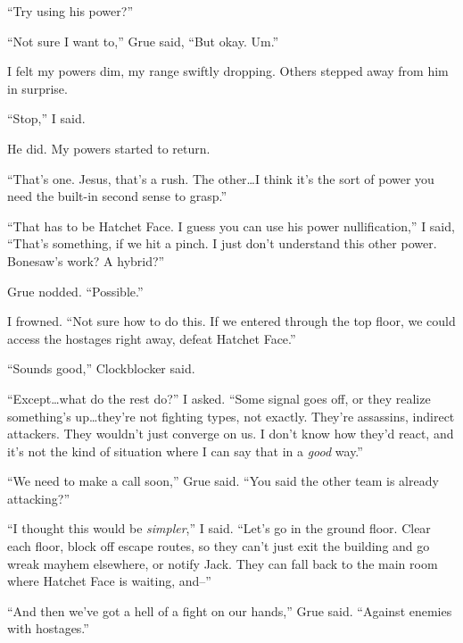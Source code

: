 ``Try using his power?''



``Not sure I want to,'' Grue said, ``But okay.  Um.''



I felt my powers dim, my range swiftly dropping.  Others stepped away from him in surprise.



``Stop,'' I said.



He did.  My powers started to return.



``That's one.  Jesus, that's a rush.  The other\ldots I think it's the sort of power you need the built-in second sense to grasp.''



``That has to be Hatchet Face.  I guess you can use his power nullification,'' I said, ``That's something, if we hit a pinch.  I just don't understand this other power.  Bonesaw's work?  A hybrid?''



Grue nodded.  ``Possible.''



I frowned.  ``Not sure how to do this.  If we entered through the top floor, we could access the hostages right away, defeat Hatchet Face.''



``Sounds good,'' Clockblocker said.



``Except\ldots what do the rest do?'' I asked.  ``Some signal goes off, or they realize something's up\ldots they're not fighting types, not exactly.  They're assassins, indirect attackers.  They wouldn't just converge on us.  I don't know how they'd react, and it's not the kind of situation where I can say that in a \emph{good} way.''



``We need to make a call soon,'' Grue said.  ``You said the other team is already attacking?''



``I thought this would be \emph{simpler},'' I said.  ``Let's go in the ground floor.  Clear each floor, block off escape routes, so they can't just exit the building and go wreak mayhem elsewhere, or notify Jack.  They can fall back to the main room where Hatchet Face is waiting, and--''



``And then we've got a hell of a fight on our hands,'' Grue said.  ``Against enemies with hostages.''



